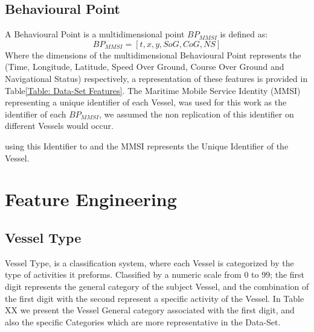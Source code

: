 \subsection{Behavioural Point}
\label{subsection: Behavioural Point}
A Behavioural Point is a multidimensional point $BP_{MMSI}$ is defined as:
\[BP_{MMSI} = [t, x, y, SoG, CoG, NS]\]
Where the dimensions of the multidimensional Behavioural Point represents the (Time, Longitude, Latitude, Speed Over Ground, Course Over Ground and Navigational Status) respectively, a representation of these features is provided in Table\ref{Table: Data-Set Features}. The Maritime Mobile Service Identity (MMSI) representing a unique identifier of each Vessel, was used for this work as the identifier of each $BP_{MMSI}$, we assumed the non replication of this identifier on different Vessels would occur.

using this Identifier to and the MMSI represents the Unique Identifier of the Vessel.



\section{Feature Engineering}
\subsection{Vessel Type}
\label{subsection: Vessel Type}
Vessel Type, is a classification system, where each Vessel is categorized by the type of activities it preforms. Classified by a numeric scale from 0 to 99; the first digit represents the general category of the subject Vessel, and the combination of the first digit with the second represent a specific activity of the Vessel. In Table XX we present the Vessel General category associated with the first digit, and also the specific Categories which are more representative in the Data-Set.

